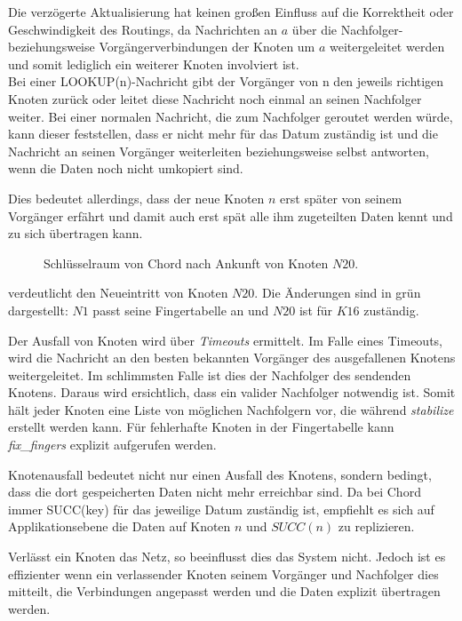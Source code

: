 Die verzögerte Aktualisierung hat keinen großen Einfluss auf die Korrektheit oder Geschwindigkeit des Routings, da Nachrichten an $a$ über die Nachfolger- beziehungsweise Vorgängerverbindungen der Knoten um $a$ weitergeleitet werden und somit lediglich ein weiterer Knoten involviert ist.\\
Bei einer LOOKUP(n)-Nachricht gibt der Vorgänger von n den jeweils richtigen Knoten zurück oder leitet diese Nachricht noch einmal an seinen Nachfolger weiter. Bei einer normalen Nachricht, die zum Nachfolger geroutet werden würde, kann dieser feststellen, dass er nicht mehr für das Datum zuständig ist und die Nachricht an seinen Vorgänger weiterleiten beziehungsweise selbst antworten, wenn die Daten noch nicht umkopiert sind. 

Dies bedeutet allerdings, dass der neue Knoten $n$ erst später von seinem Vorgänger erfährt und damit auch erst spät alle ihm zugeteilten Daten kennt und zu sich übertragen kann.

\begin{figure}[htbp]
\centering
{}
\caption{Schlüsselraum von Chord nach Ankunft von Knoten $N20$. }
\label{fig:chord_new_node}
\end{figure}

 verdeutlicht den Neueintritt von Knoten $N20$. Die Änderungen sind in grün dargestellt: $N1$ passt seine Fingertabelle an und $N20$ ist für $K16$ zuständig.

Der Ausfall von Knoten wird über \emph{Timeouts} ermittelt. Im Falle eines Timeouts, wird die Nachricht an den besten bekannten Vorgänger des ausgefallenen Knotens weitergeleitet. Im schlimmsten Falle ist dies der Nachfolger des sendenden Knotens. Daraus wird ersichtlich, dass ein valider Nachfolger notwendig ist. Somit hält jeder Knoten eine Liste von möglichen Nachfolgern vor, die während \emph{stabilize} erstellt werden kann. Für fehlerhafte Knoten in der Fingertabelle kann \emph{fix\_fingers} explizit aufgerufen werden.

Knotenausfall bedeutet nicht nur einen Ausfall des Knotens, sondern bedingt, dass die dort gespeicherten Daten nicht mehr erreichbar sind. Da bei Chord immer SUCC(key) für das jeweilige Datum zuständig ist, empfiehlt es sich auf Applikationsebene die Daten auf Knoten $n$ und $SUCC(n)$ zu replizieren.

Verlässt ein Knoten das Netz, so beeinflusst dies das System nicht. Jedoch ist es effizienter wenn ein verlassender Knoten seinem Vorgänger und Nachfolger dies mitteilt, die Verbindungen angepasst werden und die Daten explizit übertragen werden.
